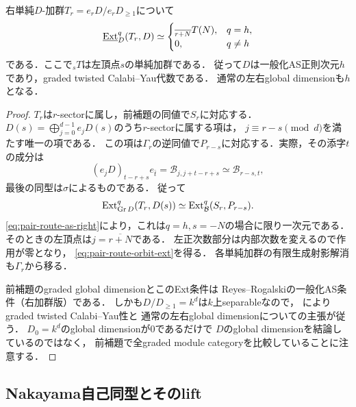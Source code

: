 \begin{lemma}[通常のAS条件と頂点置換]
\label{lem:pair-route-orbit-as}
右単純$D$-加群$T_r=e_rD/e_rD_{\geq1}$について
\begin{equation}\label{eq:pair-route-orbit-ext}
 \underline{\operatorname{Ext}}^{q}_{D}(T_r,D)
 \simeq
 \begin{cases}
 {}_{\overline{r+N}}T(N),&q=h,\\
 0,&q\ne h
 \end{cases}
\end{equation}
である．ここで${}_sT$は左頂点$s$の単純加群である．
従って$D$は一般化AS正則次元$h$であり，graded twisted Calabi--Yau代数である．
通常の左右global dimensionも$h$となる．
\end{lemma}
\begin{proof}
$T_r$は$r$-sectorに属し，前補題の同値で$S_r$に対応する．
$D(s)=\bigoplus_{j=0}^{d-1}e_jD(s)$のうち$r$-sectorに属する項は，
$j\equiv r-s\pmod d$を満たす唯一の項である．
この項は$\Gamma_r$の逆同値で$P_{r-s}$に対応する．実際，その添字$t$の成分は
\begin{equation}
 (e_jD)_{t-r+s}e_{\bar t}
 =\mathcal B_{j,j+t-r+s}
 \simeq\mathcal B_{r-s,t},
\end{equation}
最後の同型は$\sigma$によるものである．
従って
\begin{equation}
 \operatorname{Ext}^q_{\operatorname{Gr}D}(T_r,D(s))
 \simeq\operatorname{Ext}^q_{\mathcal B}(S_r,P_{r-s}).
\end{equation}
\eqref{eq:pair-route-as-right}により，これは$q=h,s=-N$の場合に限り一次元である．
そのときの左頂点は$j=\overline{r+N}$である．
左正次数部分は内部次数を変えるので作用が零となり，
\eqref{eq:pair-route-orbit-ext}を得る．
各単純加群の有限生成射影解消も$\Gamma_r$から移る．

前補題のgraded global dimensionとこのExt条件は
Reyes--Rogalskiの一般化AS条件（右加群版）である．
しかも$D/D_{\geq1}=k^d$は$k$上separableなので，
\cite[Theorem~5.15]{RRGeneralizedAS}によりgraded twisted Calabi--Yau性と
通常の左右global dimensionについての主張が従う．
$D_0=k^d$のglobal dimensionが$0$であるだけで
$D$のglobal dimensionを結論しているのではなく，
前補題で全graded module categoryを比較していることに注意する．
\end{proof}

\subsection{Nakayama自己同型とそのlift}

